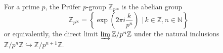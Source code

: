 For a prime $p$, the Prüfer $p$-group $\mathbb{Z}_{p^\infty}$ is the abelian group
$$\mathbb{Z}_{p^\infty} = \left\{ \exp\left(2\pi i \frac{k}{p^n}\right) \mid k \in \mathbb{Z}, n \in \mathbb{N} \right\}$$
or equivalently, the direct limit $\varinjlim \mathbb{Z}/p^n\mathbb{Z}$ under the natural inclusions $\mathbb{Z}/p^n\mathbb{Z} \hookrightarrow \mathbb{Z}/p^{n+1}\mathbb{Z}$.
